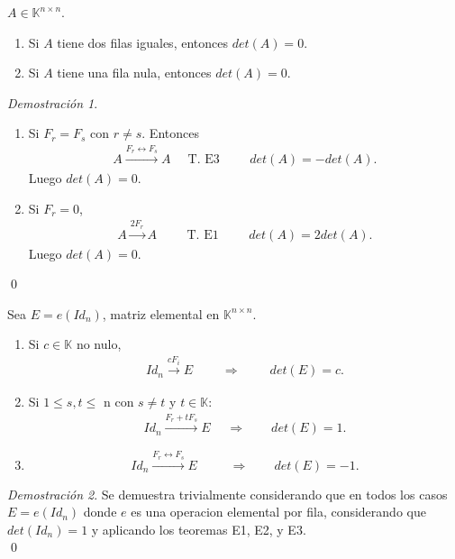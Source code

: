 \documentclass{article}
\theoremstyle{definition}
\theoremstyle{definition}
\theoremstyle{remark}
\newtheorem*{demo}{Demostración}
\begin{document}
\begin{corol}
  $A \in \mathbb{K}^{n \times n}$. \begin{enumerate}[label=\arabic*.]
    \item Si $A$ tiene dos filas iguales, entonces $det(A)=0$.
    \item Si $A$ tiene una fila nula, entonces $det(A)=0$.
    \end{enumerate}
\end{corol}
\begin{demo}\; \begin{enumerate}[label=\arabic*.]
  \item Si $F_r=F_s$ con $r \neq s$. Entonces \[\begin{array}{cccccccccccccc}
     A \xrightarrow{F_r \leftrightarrow F_s} A & \;\;\text{T. E3} &&& det(A)=-det(A).
 \end{array}
   \]
   Luego $det(A)=0$.
 \item 
   Si $F_r=0$, \[\begin{array}{cccccccccccc}
     A\xrightarrow{2F_r}A  &&& \text{T. E1}  & && det(A)=2det(A).
   \end{array}
   \]
   Luego $det(A)=0$.
\end{enumerate}
\qed
\end{demo}
\begin{corol}

  Sea $E=e(Id_n)$, matriz elemental en $\mathbb{K}^{n \times n}$. \begin{enumerate}[label=\textcolor{azulp2}{E\arabic*.}]
   \item Si $c \in \mathbb{K}$ no nulo, \[
      \begin{aligned}
        Id_n \xrightarrow{cF_i}E \quad \quad \;\Rightarrow \quad\quad \; det(E)=c.
      \end{aligned}
    \]
    \item Si $1 \leq s,t \leq $ n con $s \neq t$ y $t \in \mathbb{K}$:\[\begin{aligned}
      Id_n \xrightarrow{F_r+tF_s} E \quad\; \Rightarrow \quad\quad det(E)=1.\end{aligned}
      \]
    \item \[
        Id_n \xrightarrow{F_r \leftrightarrow F_s} E \quad\quad\;\; \Rightarrow \quad\quad det(E) = -1.
      \]
  \end{enumerate}

\end{corol}
\begin{demo}
  Se demuestra trivialmente considerando que en todos los casos $E=e(Id_n)$ donde $e$ es una operacion elemental por fila, considerando que $det(Id_n)=1$ y aplicando los teoremas E1, E2, y E3. \\ 
  \qed
\end{demo}
\end{document}
